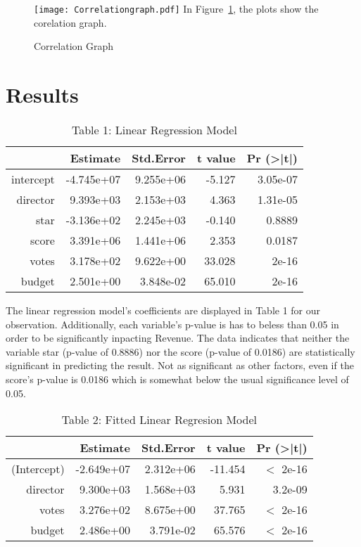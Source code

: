 \documentclass[12pt]{article}
\begin{document}
\begin{figure}
  \centering
	\caption{Correlation Graph}
	\texttt{[image: Correlationgraph.pdf]}
	\label{fig:Correlationgraph}
In Figure~\ref{fig:Correlationgraph}, the plots show the corelation graph.
\end{figure}

\section{Results}
\label{sec:res}

\begin{table}[h]
\centering
\caption{Table 1: Linear Regression Model}
\begin{tabular}{rrrrr}
\hline
 & Estimate   & Std.Error & t value & Pr (\textgreater|t|) \\
 \hline
intercept & -4.745e+07 & 9.255e+06 & -5.127  & 3.05e-07 \\ 
director  & 9.393e+03  & 2.153e+03 & 4.363   & 1.31e-05 \\ 
star      & -3.136e+02 & 2.245e+03 & -0.140  & 0.8889 \\ 
score     & 3.391e+06  & 1.441e+06 & 2.353   & 0.0187 \\ 
votes     & 3.178e+02  & 9.622e+00 & 33.028  & 2e-16 \\ 
budget    & 2.501e+00  & 3.848e-02 & 65.010  & 2e-16 \\
\hline
\end{tabular}
\end{table}

The linear regression model's coefficients are displayed in Table 1 for our observation. Additionally, each variable's p-value is has to beless than 0.05 in order to be significantly inpacting Revenue. The data indicates that neither the variable star (p-value of 0.8886) nor the score (p-value of 0.0186) are statistically significant in predicting the result. Not as significant as other factors, even if the score's p-value is 0.0186 which is somewhat below the usual significance level of 0.05.

\begin{table}[h]
\centering
\caption{Table 2: Fitted Linear Regresion Model}
\begin{tabular}{rrrrr}
\hline
 & Estimate   & Std.Error & t value & Pr (\textgreater|t|) \\ 
\hline
(Intercept) & -2.649e+07 & 2.312e+06 & -11.454 & $<$ 2e-16 \\
director    & 9.300e+03  & 1.568e+03 & 5.931   & 3.2e-09 \\
votes       & 3.276e+02  & 8.675e+00 & 37.765  & $<$ 2e-16 \\
budget      & 2.486e+00  & 3.791e-02 & 65.576  & $<$ 2e-16 \\
\hline
\end{tabular}
\end{table}
\end{document}
